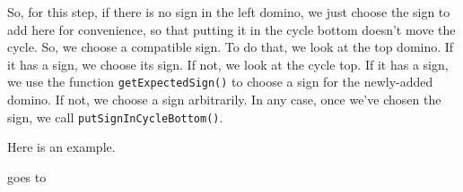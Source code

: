 \documentclass[12pt]{article}
\numberwithin{equation}{section}
\newcommand{\horizontalDominoRS}[3]{\filldraw [dominoRSStyle] (#2 - 1 + \eps, #1 - 1 + \eps) rectangle + (2 - \teps, 1 -\teps) node [dominoText] {$#3$};}
\newcommand{\verticalDominoRSShift}[4]{\filldraw [dominoRSStyle] (#2 - 1 + #4 + \eps,  #1 - 1 + \eps) rectangle + (1 - \teps,2 -\teps) node [dominoText] {$#3$};}
\begin{document}
\begin{itemize}
\begin{itemize}
      So, for this step, if there is no sign in the left domino, we just choose the sign to add here for convenience, so that putting it in the cycle bottom doesn't move the cycle.
      So, we choose a compatible sign.
      To do that, we look at the top domino.
      If it has a sign, we choose its sign.
      If not, we look at the cycle top.
      If it has a sign, we use the function \texttt{getExpectedSign()} to choose a sign for the newly-added domino.
      If not, we choose a sign arbitrarily.
      In any case, once we've chosen the sign, we call \texttt{putSignInCycleBottom()}.

      Here is an example.
      \begin{figure}[H]
        \centering
      \end{figure}
      goes to
      \begin{figure}[H]
        \centering
\end{figure}
\end{itemize}
\end{itemize}
\end{document}
